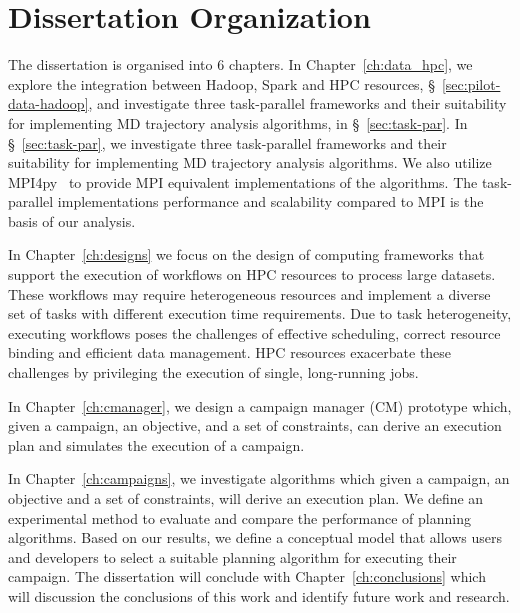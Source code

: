 \section{Dissertation Organization}
The dissertation is organised into 6 chapters.
In Chapter~\ref{ch:data_hpc}, we explore the integration between Hadoop, Spark and HPC resources, \S~\ref{sec:pilot-data-hadoop}, and investigate three task-parallel frameworks and their suitability for implementing MD trajectory analysis algorithms, in \S~\ref{sec:task-par}.
In \S~\ref{sec:task-par}, we investigate three task-parallel frameworks and their suitability for implementing MD trajectory analysis algorithms.
We also utilize MPI4py~\cite{dalcin2005mpi} to provide MPI equivalent implementations of the algorithms.
The task-parallel implementations performance and scalability compared to MPI is the basis of our analysis.

In Chapter~\ref{ch:designs} we focus on the design of computing frameworks that support the execution of workflows on HPC resources to process large datasets.
These workflows may require heterogeneous resources and implement a diverse set of tasks with different execution time requirements.
Due to task heterogeneity, executing workflows poses the challenges of effective scheduling, correct resource binding and efficient data management.
HPC resources exacerbate these challenges by privileging the execution of single, long-running jobs.

In Chapter~\ref{ch:cmanager}, we design a campaign manager (CM) prototype which, given a campaign, an objective, and a set of constraints, can derive an execution plan and simulates the execution of a campaign.

In Chapter~\ref{ch:campaigns}, we investigate algorithms which given a campaign, an objective and a set of constraints, will derive an execution plan.
We define an experimental method to evaluate and compare the performance of planning algorithms.
Based on our results, we define a conceptual model that allows users and developers to select a suitable planning algorithm for executing their campaign.
The dissertation will conclude with Chapter~\ref{ch:conclusions} which will discussion the conclusions of this work and identify future work and research.




